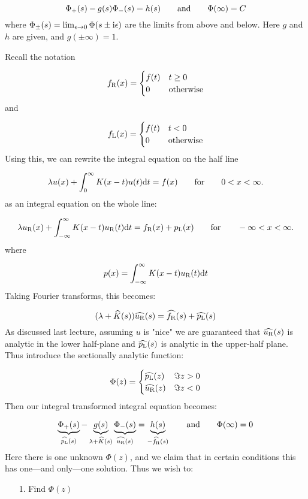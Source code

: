 \documentclass[12pt,landscape]{article}
\def\qqand{\qquad\hbox{and}\qquad}
\def\qqfor{\qquad\hbox{for}\qquad}
\def\D{ {\rm d} }
\def\I{ {\rm i} }
\def\dt{\D t}
\def\emdash{—}
\begin{document}
{\[
\Phi_+(s) - g(s)\Phi_-(s) = h(s) \qqand \Phi(\infty) = C
\]
where $\Phi_\pm(s) = \lim_{\epsilon \rightarrow 0} \Phi(s \pm \I \epsilon)$ are the limits from above and below.  Here $g$ and $h$ are given, and $g(\pm \infty) = 1$.

Recall the notation

\[
f_{\rm R}(x) = \begin{cases}f(t) & t \geq 0 \\ 0 & \hbox{otherwise} \end{cases}
\]
and

\[
f_{\rm L}(x) = \begin{cases}f(t) & t < 0 \\ 0 & \hbox{otherwise} \end{cases}
\]
Using this, we can rewrite the integral equation on the half line

\[
\lambda u(x) + \int_{0}^\infty K(x-t)u(t) \dt = f(x)\qqfor 0 < x < \infty.
\]
as an integral equation on the whole line:

\[
\lambda u_{\rm R}(x) + \int_{-\infty}^\infty K(x-t)u_{\rm R}(t) \dt = f_{\rm R}(x) + p_{\rm L}(x)\qqfor -\infty < x < \infty.
\]
where

\[
p(x) = \int_{-\infty}^\infty K(x-t)u_{\rm R}(t) \dt
\]
Taking Fourier transforms, this becomes:

\[
(\lambda + \widehat K(s)) \widehat{u_{\rm R}}(s) = \widehat{f_{\rm R}}(s) + \widehat{p_{\rm L}}(s)
\]
As discussed last lecture, assuming $u$ is "nice" we are guaranteed that $\widehat{ u_{\rm R}}(s)$ is analytic in the lower half-plane and $\widehat{ p_{\rm L}}(s)$ is analytic in the upper-half plane. Thus introduce the sectionally analytic function:

\[
\Phi(z) = \begin{cases}  \widehat{p_{\rm L}}(z) & \Im z > 0 \\
                            \widehat{u_{\rm R}}(z) & \Im z < 0
                            \end{cases}
\]
Then our integral transformed integral equation becomes:

\[
\underbrace{\Phi_+(s)}_{\widehat{p_{\rm L}}(s)} - \underbrace{g(s)}_{\lambda + \widehat K(s)} \underbrace{\Phi_-(s)}_{\widehat{u_{\rm R}}(s)} = \underbrace{h(s)}_{-\widehat{f_{\rm R}}(s) } \qqand \Phi(\infty) = 0
\]
Here there is one unknown $\Phi(z)$, and we claim that in certain conditions this has one\ensuremath{\emdash}and only\ensuremath{\emdash}one solution. Thus we wish to:

\begin{itemize}
\item[1. ] Find $\Phi(z)$



\end{itemize}}
\end{document}
